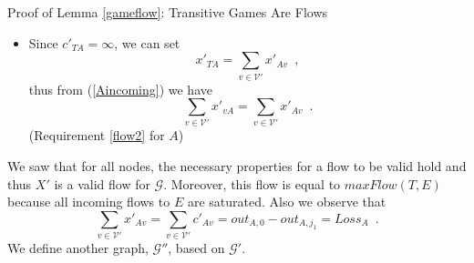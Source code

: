 \begin{sepproof}{Proof of Lemma \ref{gameflow}: Transitive Games Are Flows}
\begin{itemize}
      \begin{equation*}
         x'_{Tv} = \left(out_{v, 0} - out_{v, j_1}\right) - \left(in_{v, 0} - in_{v, j_1}\right) \enspace.
      \end{equation*}
      In this way, we have
      \begin{equation*}
         \sum\limits_{w \in \mathcal{V}'}x'_{vw} = out_{v, 0} - out_{v, j_1} \mbox{ and}
      \end{equation*}
      \begin{equation*}
      \begin{gathered}
         \sum\limits_{w \in \mathcal{V}'}x'_{wv} = \sum\limits_{w \in \mathcal{V}' \setminus \{T\}}c'_{wv} + x'_{Tv} =
         in_{v, 0} - in_{v, j_1} + \\ + (out_{v, 0} - out_{v, j_1}) - (in_{v, 0} - in_{v, j_1}) = out_{v, 0} -
         out_{v, j_1} \enspace.
      \end{gathered}
      \end{equation*}
      thus
      \begin{equation*}
         \sum\limits_{w \in \mathcal{V}'}x'_{vw} = \sum\limits_{w \in \mathcal{V}'}x'_{wv} \enspace.
      \end{equation*}
      (Requirement \ref{flow2} $\forall v \in Sad_{j_1}$)
      \item Since $c'_{TA} = \infty$, we can set
      \begin{equation*}
         x'_{TA} = \sum\limits_{v \in \mathcal{V}'}x'_{Av} \enspace,
      \end{equation*}
      thus from (\ref{Aincoming}) we have
      \begin{equation*}
         \sum\limits_{v \in \mathcal{V}'}x'_{vA} = \sum\limits_{v \in \mathcal{V}'}x'_{Av} \enspace.
      \end{equation*}
      (Requirement \ref{flow2} for $A$)
   \end{itemize}
   We saw that for all nodes, the necessary properties for a flow to be valid hold and thus $X'$ is a valid flow for
   $\mathcal{G}$. Moreover, this flow is equal to $maxFlow(T, E)$ because all incoming flows to $E$ are saturated.
   Also we observe that
   \begin{equation}
   \label{xprimeequalloss}
      \sum\limits_{v \in \mathcal{V}'}x'_{Av} = \sum\limits_{v \in \mathcal{V}'}c'_{Av} = out_{A, 0} - out_{A, j_1} =
      Loss_A \enspace.
   \end{equation}
   We define another graph, $\mathcal{G}''$, based on $\mathcal{G}'$.
   \begin{equation*}

\end{equation*}
\end{sepproof}
